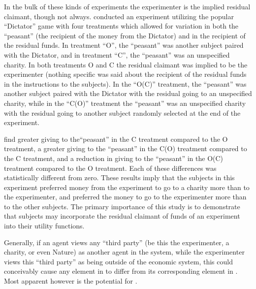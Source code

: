 \documentclass[../main.tex]{subfiles}
\begin{document}
In the bulk of these kinds of experiments the experimenter is the implied residual claimant, though not always.
\textcite{Harrison2006} conducted an experiment utilizing the popular \enquote{Dictator} game with four treatments which allowed for variation in both the \enquote{peasant} (the recipient of the money from the Dictator) and in the recipient of the residual funds.
In treatment \enquote{O}, the \enquote{peasant} was another subject paired with the Dictator, and in treatment \enquote{C}, the \enquote{peasant} was an unspecified charity.
In both treatments O and C the residual claimant was implied to be the experimenter (nothing specific was said about the recipient of the residual funds in the instructions to the subjects).
In the \enquote{O(C)} treatment, the \enquote{peasant} was another subject paired with the Dictator with the residual going to an unspecified charity, while in the \enquote{C(O)} treatment the \enquote{peasant} was an unspecified charity with the residual going to another subject randomly selected at the end of the experiment.

\textcite[196]{Harrison2006} find greater giving to the\enquote{peasant} in the C treatment compared to the O treatment, a greater giving to the \enquote{peasant} in the C(O) treatment compared to the C treatment, and a reduction in giving to the \enquote{peasant} in the O(C) treatment compared to the O treatment.
Each of these differences was statistically different from zero.
These results imply that the subjects in this experiment preferred money from the experiment to go to a charity more than to the experimenter, and preferred the money to go to the experimenter more than to the other subjects.
The primary importance of this study is to demonstrate that subjects may incorporate the residual claimant of funds of an experiment into their utility functions. 

Generally, if an agent views any \enquote{third party} (be this the experimenter, a charity, or even Nature) as another agent in the system, while the experimenter views this \enquote{third party} as being outside of the economic system, this could conceivably cause any element in  to differ from its corresponding element in .
Most apparent however is the potential for .
\end{document}
